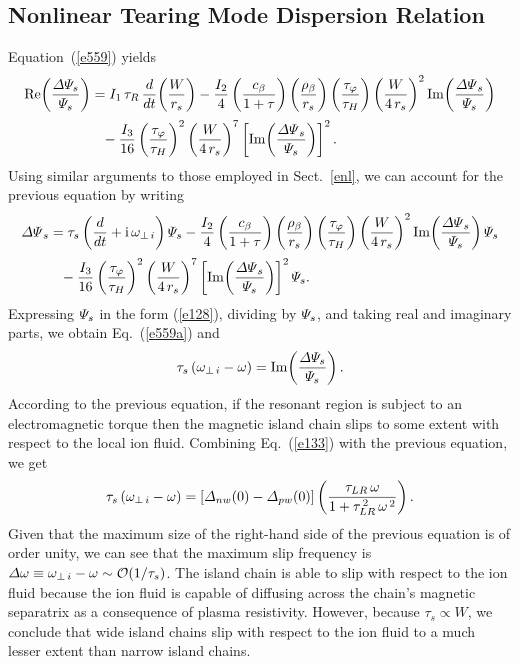 \documentclass[12pt,prb,aps]{revtex4-1}
\begin{document}
\subsection{Nonlinear Tearing Mode Dispersion Relation}
Equation~(\ref{e559}) yields
\begin{align}\label{e559a}
{\rm Re}\!\left(\frac{{\mit\Delta}{\mit\Psi}_s}{{\mit\Psi}_s}\right)&= I_1\,\tau_R\,\frac{d}{dt}\!\left(\frac{W}{r_s}\right)
- \frac{I_2}{4}\left(\frac{c_\beta}{1+\tau}\right)\left(\frac{\rho_\beta}{r_s}\right)\left(\frac{\tau_\varphi}{\tau_H}\right)\left(\frac{W}{4\,r_s}\right)^2 {\rm Im}\!\left(\frac{{\mit\Delta\Psi}_s}{{\mit\Psi}_s}\right)\nonumber\\[0.5ex]
&\phantom{=} -\frac{I_3}{16}\left(\frac{\tau_\varphi}{\tau_H}\right)^2 \left(\frac{W}{4\,r_s}\right)^7\left[{\rm Im}\!\left(\frac{{\mit\Delta\Psi}_s}{{\mit\Psi}_s}\right)\right]^2.
\end{align}
Using similar arguments to those employed in Sect.~\ref{enl}, we can account for the previous equation
by writing
\begin{align}
{\mit\Delta\Psi}_s &= \tau_s\left(\frac{d}{dt}+{\rm i}\,\omega_{\perp\,i}\right){\mit\Psi}_s
- \frac{I_2}{4}\left(\frac{c_\beta}{1+\tau}\right)\left(\frac{\rho_\beta}{r_s}\right)\left(\frac{\tau_\varphi}{\tau_H}\right)\left(\frac{W}{4\,r_s}\right)^2 {\rm Im}\!\left(\frac{{\mit\Delta\Psi}_s}{{\mit\Psi}_s}\right){\mit\Psi}_s\nonumber\\[0.5ex]
&\phantom{=} -\frac{I_3}{16}\left(\frac{\tau_\varphi}{\tau_H}\right)^2 \left(\frac{W}{4\,r_s}\right)^7\left[{\rm Im}\!\left(\frac{{\mit\Delta\Psi}_s}{{\mit\Psi}_s}\right)\right]^2{\mit\Psi}_s.
\end{align}
Expressing ${\mit\Psi}_s$ in the form (\ref{e128}), dividing by ${\mit\Psi}_s$, and taking real and imaginary parts, we obtain Eq.~(\ref{e559a})
and 
\begin{equation}
\tau_s\,(\omega_{\perp\,i}-\omega) = {\rm Im}\!\left(\frac{{\mit\Delta}{\mit\Psi}_s}{{\mit\Psi}_s}\right).
\end{equation}
According to the previous equation, if the resonant region is subject to an electromagnetic torque then the magnetic island
chain slips to some extent with respect to the local ion fluid. Combining Eq.~(\ref{e133}) with the previous equation, we
get 
\begin{equation}
\tau_s\,(\omega_{\perp\,i}-\omega) = [{\mit\Delta}_{nw}(0)-{\mit\Delta}_{pw}(0)]\left(\frac{\tau_{LR}\,\omega}{1+\tau_{LR}^{\,2}\,\omega^{\,2}}\right).
\end{equation}
Given that the maximum size of the right-hand side of the previous equation is of order unity, we can
see that the maximum slip frequency is ${\mit\Delta}\omega \equiv \omega_{\perp\,i}-\omega
\sim {\cal O}(1/\tau_s)$. The island chain is able to slip with respect to the ion fluid because the ion fluid
is capable of diffusing across the chain's magnetic separatrix as a consequence of plasma resistivity.\cite{slip1,slip2,rf2021} However, because $\tau_s\propto W$, we conclude that wide island chains slip with respect to the ion
fluid to a much lesser extent than narrow island chains. 
\end{document}
